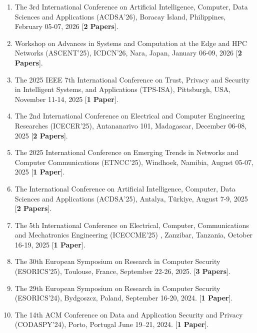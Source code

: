\documentclass[11pt, a4paper]{article}
\begin{document}
{\begin{enumerate}[leftmargin=*, label=\arabic*., itemsep=4pt, topsep=2pt]
\item The 3rd International Conference on Artificial Intelligence, Computer, Data Sciences and Applications (ACDSA'26), Boracay Island, Philippines, February 05-07, 2026 [\textbf{\color{cvred}2 Papers}].

\item Workshop on Advances in Systems and Computation at the Edge and HPC Networks (ASCENT'25), ICDCN'26, Nara, Japan, January 06-09, 2026 [\textbf{\color{cvred}2 Papers}].

\item The 2025 IEEE 7th International Conference on Trust, Privacy and Security in Intelligent Systems, and Applications (TPS-ISA), Pittsburgh, USA, November 11-14, 2025 [\textbf{\color{cvred}1 Paper}].

\item The 2nd International Conference on Electrical and Computer Engineering Researches (ICECER'25), Antananarivo 101, Madagascar, December 06-08, 2025 [\textbf{\color{cvred}2 Papers}].

\item The 2025 International Conference on Emerging Trends in Networks and Computer Communications (ETNCC'25), Windhoek, Namibia, August 05-07, 2025 [\textbf{\color{cvred}1 Paper}].

\item The International Conference on Artificial Intelligence, Computer, Data Sciences and Applications (ACDSA'25), Antalya, Türkiye, August 7-9, 2025 [\textbf{\color{cvred}2 Papers}].

\item The 5th International Conference on Electrical, Computer, Communications and Mechatronics Engineering (ICECCME'25) , Zanzibar, Tanzania, October 16-19, 2025 [\textbf{\color{cvred}1 Paper}].

\item The 30th European Symposium on Research in Computer Security (ESORICS'25), Toulouse, France, September 22-26, 2025. [\textbf{\color{cvred}3 Papers}].

\item The 29th European Symposium on Research in Computer Security (ESORICS'24), Bydgoszcz, Poland, September 16-20, 2024. [\textbf{\color{cvred}1 Paper}].

\item The 14th ACM Conference on Data and Application Security and Privacy (CODASPY'24), Porto, Portugal June 19--21, 2024. [\textbf{\color{cvred}1 Paper}].


\end{enumerate}}
\end{document}
